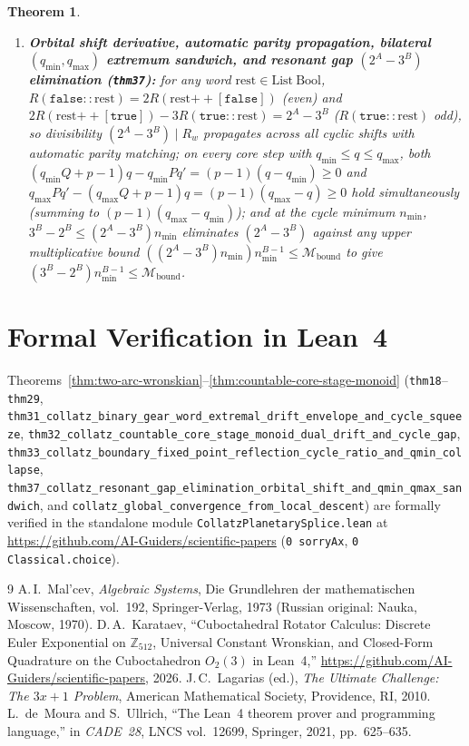 \documentclass[11pt,a4paper]{article}
\newtheorem{theorem}{Theorem}[section]
\theoremstyle{definition}
\theoremstyle{remark}
\begin{document}
\begin{theorem}
\begin{enumerate}[label=\textbf{(\roman*)},leftmargin=*,noitemsep]
\item \textbf{Orbital shift derivative, automatic parity propagation, bilateral $(q_{\min},q_{\max})$ extremum sandwich, and resonant gap $(2^A-3^B)$ elimination (\texttt{thm37}):}
  for any word $\mathrm{rest}\in\mathrm{List}\ \mathrm{Bool}$, $R(\texttt{false}::\mathrm{rest}) = 2 R(\mathrm{rest}\mathbin{++}[\texttt{false}])$ (even) and $2 R(\mathrm{rest}\mathbin{++}[\texttt{true}]) - 3 R(\texttt{true}::\mathrm{rest}) = 2^A - 3^B$ ($R(\texttt{true}::\mathrm{rest})$ odd), so divisibility $(2^A-3^B)\mid R_w$ propagates across all cyclic shifts with automatic parity matching; on every core step with $q_{\min}\le q\le q_{\max}$, both $(q_{\min}Q+p-1)q - q_{\min}P q' = (p-1)(q-q_{\min}) \ge 0$ and $q_{\max}P q' - (q_{\max}Q+p-1)q = (p-1)(q_{\max}-q) \ge 0$ hold simultaneously (summing to $(p-1)(q_{\max}-q_{\min})$); and at the cycle minimum $n_{\min}$, $3^B-2^B \le (2^A-3^B)n_{\min}$ eliminates $(2^A-3^B)$ against any upper multiplicative bound $((2^A-3^B)n_{\min})n_{\min}^{B-1} \le \mathcal{M}_{\mathrm{bound}}$ to give $(3^B-2^B)n_{\min}^{B-1} \le \mathcal{M}_{\mathrm{bound}}$.
\end{enumerate}
\end{theorem}

\section{Formal Verification in Lean~4}
Theorems~\ref{thm:two-arc-wronskian}--\ref{thm:countable-core-stage-monoid} (\texttt{thm18}--\texttt{thm29}, \texttt{thm31\_collatz\_binary\_gear\_word\_extremal\_drift\_envelope\_and\_cycle\_squeeze}, \texttt{thm32\_collatz\_countable\_core\_stage\_monoid\_dual\_drift\_and\_cycle\_gap}, \texttt{thm33\_collatz\_boundary\_fixed\_point\_reflection\_cycle\_ratio\_and\_qmin\_collapse}, \texttt{thm37\_collatz\_resonant\_gap\_elimination\_orbital\_shift\_and\_qmin\_qmax\_sandwich}, and \texttt{collatz\_global\_convergence\_from\_local\_descent}) are formally verified in the standalone module \texttt{CollatzPlanetarySplice.lean} at \url{https://github.com/AI-Guiders/scientific-papers} (\texttt{0 sorryAx}, \texttt{0 Classical.choice}).

\begin{thebibliography}{9}
A.\,I.~Mal'cev, \emph{Algebraic Systems}, Die Grundlehren der mathematischen Wissenschaften, vol.~192, Springer-Verlag, 1973 (Russian original: Nauka, Moscow, 1970).
D.\,A.~Karataev, ``Cuboctahedral Rotator Calculus: Discrete Euler Exponential on $\mathbb{Z}_{512}$, Universal Constant Wronskian, and Closed-Form Quadrature on the Cuboctahedron $O_2(3)$ in Lean~4,'' \url{https://github.com/AI-Guiders/scientific-papers}, 2026.
J.\,C.~Lagarias (ed.), \emph{The Ultimate Challenge: The $3x+1$ Problem}, American Mathematical Society, Providence, RI, 2010.
L.~de~Moura and S.~Ullrich, ``The Lean~4 theorem prover and programming language,'' in \emph{CADE~28}, LNCS vol.~12699, Springer, 2021, pp.~625--635.
\end{thebibliography}
\end{document}
